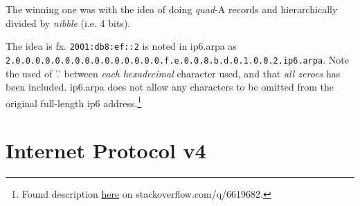 The winning one was  with the idea of doing \textit{quad}-A records and hierarchically divided by \textit{nibble} {\small (i.e. 4 bits)}.

The idea is fx. \texttt{2001:db8:ef::2} is noted in ip6.arpa as \texttt{2.0.0.0.0.0.0.0.0.0.0.0.0.0.0.0.f.e.0.0.8.b.d.0.1.0.0.2.ip6.arpa}. {\small Note the used of '.' between \textit{each} \textit{hexadecimal} character used, and that \textit{all zeroes} has been included. ip6.arpa does not allow any characters to be omitted from the original full-length \gls{ip6} address.}\footnote{Found description \href{https://stackoverflow.com/q/6619682}{here} on stackoverflow.com/q/6619682.}

\section[IPv4]{Internet Protocol v4}